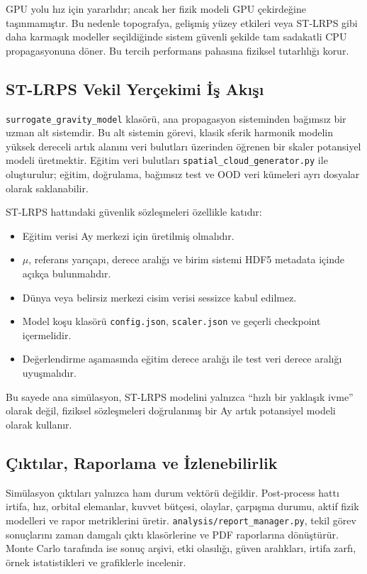 GPU yolu hız için yararlıdır; ancak her fizik modeli GPU çekirdeğine taşınmamıştır. Bu nedenle topografya, gelişmiş yüzey etkileri veya ST-LRPS gibi daha karmaşık modeller seçildiğinde sistem güvenli şekilde tam sadakatli CPU propagasyonuna döner. Bu tercih performans pahasına fiziksel tutarlılığı korur.

\subsection{ST-LRPS Vekil Yerçekimi İş Akışı}

\texttt{surrogate\_gravity\_model} klasörü, ana propagasyon sisteminden bağımsız bir uzman alt sistemdir. Bu alt sistemin görevi, klasik sferik harmonik modelin yüksek dereceli artık alanını veri bulutları üzerinden öğrenen bir skaler potansiyel modeli üretmektir. Eğitim veri bulutları \texttt{spatial\_cloud\_generator.py} ile oluşturulur; eğitim, doğrulama, bağımsız test ve OOD veri kümeleri ayrı dosyalar olarak saklanabilir.

ST-LRPS hattındaki güvenlik sözleşmeleri özellikle katıdır:
\begin{itemize}
    \item Eğitim verisi Ay merkezi için üretilmiş olmalıdır.
    \item \(\mu\), referans yarıçapı, derece aralığı ve birim sistemi HDF5 metadata içinde açıkça bulunmalıdır.
    \item Dünya veya belirsiz merkezi cisim verisi sessizce kabul edilmez.
    \item Model koşu klasörü \texttt{config.json}, \texttt{scaler.json} ve geçerli checkpoint içermelidir.
    \item Değerlendirme aşamasında eğitim derece aralığı ile test veri derece aralığı uyuşmalıdır.
\end{itemize}

Bu sayede ana simülasyon, ST-LRPS modelini yalnızca ``hızlı bir yaklaşık ivme'' olarak değil, fiziksel sözleşmeleri doğrulanmış bir Ay artık potansiyel modeli olarak kullanır.

\subsection{Çıktılar, Raporlama ve İzlenebilirlik}

Simülasyon çıktıları yalnızca ham durum vektörü değildir. Post-process hattı irtifa, hız, orbital elemanlar, kuvvet bütçesi, olaylar, çarpışma durumu, aktif fizik modelleri ve rapor metriklerini üretir. \texttt{analysis/report\_manager.py}, tekil görev sonuçlarını zaman damgalı çıktı klasörlerine ve PDF raporlarına dönüştürür. Monte Carlo tarafında ise sonuç arşivi, etki olasılığı, güven aralıkları, irtifa zarfı, örnek istatistikleri ve grafiklerle incelenir.

